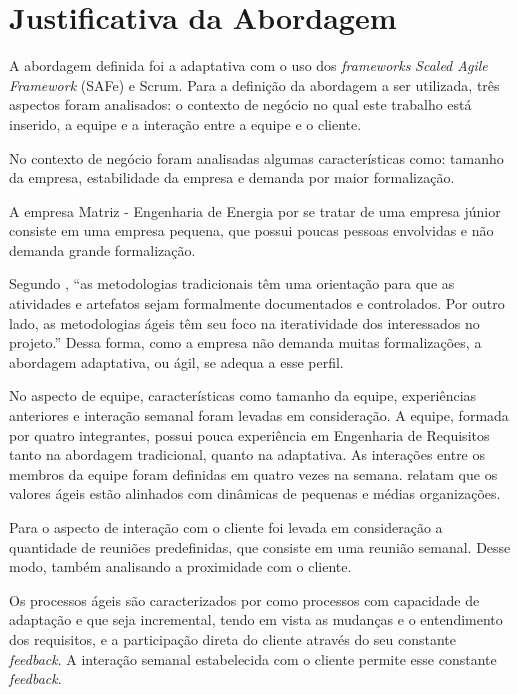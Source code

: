 \chapter[Justificativa]{Justificativa da Abordagem}



A abordagem definida foi a adaptativa com o uso dos \textit{frameworks} \emph{Scaled Agile Framework} (SAFe) e Scrum. 
Para a definição da abordagem a ser utilizada, 
três aspectos foram analisados: o contexto de negócio no qual este trabalho está inserido,
a equipe e a interação entre a equipe e o cliente.

No contexto de negócio foram analisadas algumas características como: tamanho da empresa,
estabilidade da empresa e demanda por maior formalização.

A empresa Matriz - Engenharia de Energia por se tratar de uma empresa júnior consiste
em uma empresa pequena, que possui poucas pessoas envolvidas e não demanda grande formalização.

Segundo , ``as metodologias tradicionais têm uma orientação
para que as atividades e artefatos sejam formalmente documentados e controlados. Por outro lado, as metodologias ágeis têm seu foco
na iteratividade dos interessados no projeto.'' Dessa forma, como a empresa não demanda muitas formalizações, a abordagem adaptativa, ou ágil,
se adequa a esse perfil.

No aspecto de equipe, características como tamanho da equipe, experiências anteriores e interação semanal 
foram levadas em consideração. A equipe, formada por quatro integrantes, possui pouca experiência 
em Engenharia de Requisitos tanto na abordagem tradicional, quanto na adaptativa. 
As interações entre os membros da equipe foram definidas em quatro vezes na semana.
 relatam que os valores ágeis estão alinhados com dinâmicas de pequenas e médias organizações.

Para o aspecto de interação com o cliente foi levada em consideração a quantidade de
reuniões predefinidas, que consiste em uma reunião semanal. Desse modo, também analisando 
a proximidade com o cliente.

Os processos ágeis são caracterizados por  como processos
com capacidade de adaptação e que seja incremental, tendo em vista as
mudanças e o entendimento dos requisitos, e a participação direta do cliente através
do seu constante \textit{feedback}. A interação semanal estabelecida com o cliente permite esse constante
\textit{feedback}.

